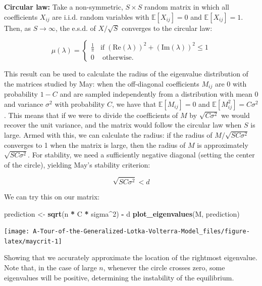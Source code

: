 \documentclass[]{book}
\newenvironment{Shaded}{\begin{snugshade}}{\end{snugshade}}
\newcommand{\DecValTok}[1]{\textcolor[rgb]{0.00,0.00,0.81}{#1}}
\newcommand{\KeywordTok}[1]{\textcolor[rgb]{0.13,0.29,0.53}{\textbf{#1}}}
\newcommand{\NormalTok}[1]{#1}
\newcommand{\OperatorTok}[1]{\textcolor[rgb]{0.81,0.36,0.00}{\textbf{#1}}}
\newcommand{\StringTok}[1]{\textcolor[rgb]{0.31,0.60,0.02}{#1}}
\begin{document}
\textbf{Circular law:} Take a non-symmetric, \(S \times S\) random matrix in which all coefficients \(X_{ij}\) are i.i.d. random variables with \(\mathbb E[X_{ij}] = 0\) and \(\mathbb E[X_{ij}] = 1\). Then, as \(S \to \infty\), the e.s.d. of \({X} / \sqrt{S}\) converges to the circular law:

\[
  \mu(\lambda) = \begin{cases}
    \frac{1}{\pi} \; \; \; \text{if} \; (\text{Re}(\lambda))^2 +
    (\text{Im}(\lambda))^2 \leq 1\\
    0 \; \; \;\text{ otherwise}.
  \end{cases}
\]

This result can be used to calculate the radius of the eigenvalue distribution of the matrices studied by May: when the off-diagonal coefficients \(M_{ij}\) are 0 with probability \(1-C\) and are sampled independently from a distribution with mean \(0\) and variance \(\sigma^2\) with probability \(C\), we have that \(\mathbb E[M_{ij}] = 0\) and \(\mathbb E[M_{ij}^2] = C \sigma^2\). This means that if we were to divide the coefficients of \({M}\) by \(\sqrt{C \sigma^2}\) we would recover the unit variance, and the matrix would follow the circular law when \(S\) is large. Armed with this, we can calculate the radius: if the radius of \({M} / \sqrt{S C \sigma^2}\) converges to 1 when the matrix is large, then the radius of \({M}\) is approximately \(\sqrt{S C \sigma^2}\). For stability, we need a sufficiently negative diagonal (setting the center of the circle), yielding May's stability criterion:

\[
\sqrt{S C \sigma^2} < d
\]

We can try this on our matrix:

\begin{Shaded}
\begin{Highlighting}[]
\NormalTok{prediction <-}\StringTok{ }\KeywordTok{sqrt}\NormalTok{(n }\OperatorTok{*}\StringTok{ }\NormalTok{C }\OperatorTok{*}\StringTok{ }\NormalTok{sigma}\OperatorTok{^}\DecValTok{2}\NormalTok{) }\OperatorTok{-}\StringTok{ }\NormalTok{d}
\KeywordTok{plot_eigenvalues}\NormalTok{(M, prediction)}
\end{Highlighting}
\end{Shaded}

\begin{center}\texttt{[image: A-Tour-of-the-Generalized-Lotka-Volterra-Model\_files/figure-latex/maycrit-1]} \end{center}

Showing that we accurately approximate the location of the rightmost eigenvalue. Note that, in the case of large \(n\), whenever the circle crosses zero, some eigenvalues will be positive, determining the instability of the equilibrium.
\end{document}
